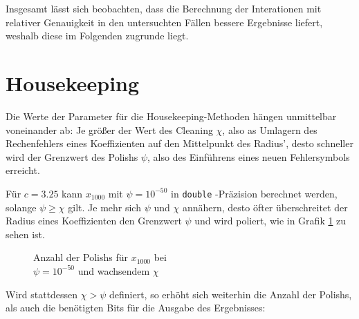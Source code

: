 Insgesamt lässt sich beobachten, dass die Berechnung der Interationen mit relativer Genauigkeit in den untersuchten Fällen bessere Ergebnisse liefert, weshalb diese im Folgenden zugrunde liegt.

\section{Housekeeping}
Die Werte der Parameter für die Housekeeping-Methoden hängen unmittelbar voneinander ab: Je größer der Wert des Cleaning $\chi$, also as Umlagern des Rechenfehlers eines Koeffizienten auf den Mittelpunkt des Radius', desto schneller wird der Grenzwert des Polishs $\psi$, also des Einführens eines neuen Fehlersymbols erreicht.

Für $c=3.25$ kann $x_{1000}$ mit $\psi = 10^{-50}$ in \verb+double+ -Präzision berechnet werden, solange $\psi \geq \chi$ gilt. Je mehr sich $\psi$ und $\chi$ annähern, desto öfter überschreitet der Radius eines Koeffizienten den Grenzwert $\psi$ und wird poliert, wie in Grafik \ref{fig:polish} zu sehen ist.

\begin{figure}[ht]
    \centering
    \caption[Grenzwertvergleich]{Anzahl der Polishs für $x_{1000}$ bei \\ $\psi = 10^{-50}$ und wachsendem $\chi$}
    \label{fig:polish}
\end{figure}

Wird stattdessen $\chi>\psi$ definiert, so erhöht sich weiterhin die Anzahl der Polishs, als auch die benötigten Bits für die Ausgabe des Ergebnisses:


